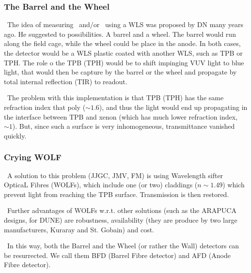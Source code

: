 \begin{frame}
\frametitle{The Barrel and the Wheel}

\blt\ The idea of measuring \sone\ and/or \stwo\ using a WLS was proposed by DN many years ago. He suggested to possibilities. A barrel and a wheel. The barrel would run along the field cage, while the wheel could be place in the anode. In both cases, the detector would be a WLS plastic coated with another WLS, such as TPB or TPH. The role o the TPB (TPH) would be to shift impinging VUV light to blue light, that would then be capture by the barrel or the wheel and propagate by total internal reflection (TIR) to readout. 

\blt\ The problem with this implementation is that TPB (TPH) has the same refraction index that poly ($\sim 1.6$), and thus the light would end up propagating in the interface between TPB and xenon (which has much lower refraction index, $\sim 1$). But, since such a surface is very inhomogeneous, transmittance vanished quickly.
\end{frame}

\begin{frame}
\frametitle{Crying WOLF}

\blt\ A solution to this problem (JJGC, JMV, FM) is using Wavelength sifter OpticaL Fibres (WOLFs), which include one (or two) claddings ($n \sim 1.49$) which prevent light from reaching the TPB surface. Transmission is then restored. 

\blt\ Further advantages of WOLFs w.r.t. other solutions (such as the ARAPUCA designs, for DUNE) are robustness, availability (they are produce by two large manufacturers, Kuraray and St. Gobain) and cost.  

\blt\ In this way, both the Barrel and the Wheel (or rather the Wall) detectors can be resurrected. We call them BFD (Barrel Fibre detector) and AFD (Anode Fibre detector).  

\end{frame}

